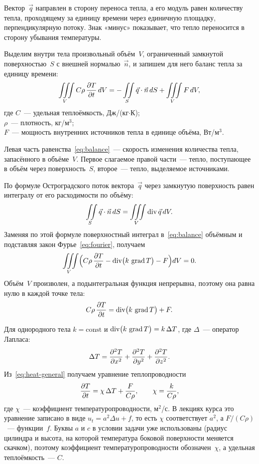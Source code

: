 Вектор~$\vec q$ направлен в сторону переноса тепла, а его модуль равен
количеству тепла, проходящему за единицу времени через единичную площадку,
перпендикулярную потоку. Знак «минус» показывает, что тепло переносится
в сторону убывания температуры.

Выделим внутри тела произвольный объём~$V$, ограниченный замкнутой
поверхностью~$S$ с внешней нормалью~$\vec n$, и запишем для него баланс
тепла за единицу времени:
\begin{equation}
\label{eq:balance}
\iiint\limits_V C\rho\,\pd{T}{t}\,dV
=-\iint\limits_S \vec q\cdot\vec n\,dS+\iiint\limits_V F\,dV,
\postdisplaypenalty=10000
\end{equation}
где $C$~— удельная теплоёмкость, Дж/(кг$\cdot$К);\\
\hphantom{где }$\rho$~— плотность, кг/м$^3$;\\
\hphantom{где }$F$~— мощность внутренних источников тепла в единице объёма,
Вт/м$^3$.

Левая часть равенства~\eqref{eq:balance}~— скорость изменения количества
тепла, запасённого в объёме~$V$. Первое слагаемое правой части~— тепло,
поступающее в объём через поверхность~$S$, второе~— тепло, выделяемое
источниками.

По формуле Остроградского поток вектора~$\vec q$ через замкнутую поверхность
равен интегралу от его расходимости по объёму:
\begin{equation}
\label{eq:ostrogradsky}
\iint\limits_S \vec q\cdot\vec n\,dS=\iiint\limits_V \operatorname{div}\vec q\,dV .
\end{equation}
Заменяя по этой формуле поверхностный интеграл в~\eqref{eq:balance}
объёмным и подставляя закон Фурье~\eqref{eq:fourier}, получаем
\begin{equation}
\label{eq:balance-vol}
\iiint\limits_V\Bigl(C\rho\,\dfrac{\partial T}{\partial t}-\operatorname{div}\bigl(k\,\operatorname{grad} T\bigr)-F\Bigr)dV=0 .
\end{equation}
Объём~$V$ произволен, а подынтегральная функция непрерывна, поэтому она
равна нулю в каждой точке тела:
\begin{equation}
\label{eq:heat-general}
C\rho\,\dfrac{\partial T}{\partial t}=\operatorname{div}\bigl(k\,\operatorname{grad} T\bigr)+F .
\end{equation}

Для однородного тела $k=\mathrm{const}$ и
$\operatorname{div}\bigl(k\,\operatorname{grad} T\bigr)=k\,\Delta T$, где $\Delta$~— оператор Лапласа:
\begin{equation}
\label{eq:lap-cart}
\Delta T=\dfrac{\partial^2 T}{\partial x^2}+\dfrac{\partial^2 T}{\partial y^2}+\dfrac{\partial^2 T}{\partial z^2} .
\end{equation}
Из~\eqref{eq:heat-general} получаем уравнение теплопроводности
\begin{equation}
\label{eq:heat}
\pd{T}{t}=\chi\,\Delta T+\frac{F}{C\rho},
\qquad \chi=\frac{k}{C\rho},
\postdisplaypenalty=10000
\end{equation}
где $\chi$~— коэффициент температуропроводности, м$^2$/с. В лекциях курса
это уравнение записано в виде $u_t=a^2\Delta u+f$, то есть $\chi$
соответствует $a^2$, а $F/(C\rho)$~— функции~$f$. Буквы $a$ и $c$ в условии
задачи уже использованы (радиус цилиндра и высота, на которой температура
боковой поверхности меняется скачком), поэтому коэффициент
температуропроводности обозначен~$\chi$, а удельная теплоёмкость~— $C$.

